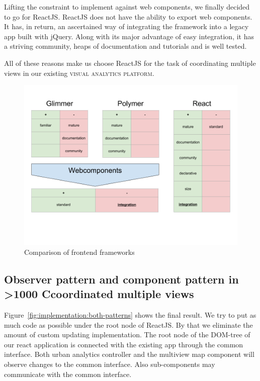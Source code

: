 \documentclass{article}
\newcommand{\visan}{\textsc{visual analytics platform}}
\newcommand\hmm[1]{\ifnum\ifhmode\spacefactor\else2000\fi>1000 \uppercase{#1}\else#1\fi}
\newcommand{\cmvs}{\hmm{c}oordinated multiple views}
\begin{document}
Lifting the constraint to implement against web components, we finally decided to go for ReactJS\cite{React2017}.
ReactJS does not have the ability to export web components.
It has, in return, an ascertained way of integrating the framework into a legacy app built with jQuery.
Along with its major advantage of easy integration, it has a striving community, heaps of documentation and tutorials and is well tested.

All of these reasons make us choose ReactJS for the task of coordinating multiple views in our existing \visan{}.




\begin{figure}[h!]
  \centering
  \includegraphics[width=\textwidth]{images/frontend-frameworks.png}
  \caption{Comparison of frontend frameworks}
  \label{fig:implementation:frontend-frameworks}
\end{figure}

\subsection{Observer pattern and component pattern in \cmvs{}}
Figure~\ref{fig:implementation:both-patterns} shows the final result.
We try to put as much code as possible under the root node of ReactJS.
By that we eliminate the amount of custom updating implementation.
The root node of the DOM-tree of our react application is connected with the existing app through the common interface.
Both urban analytics controller and the multiview map component will observe changes to the common interface.
Also sub-components may communicate with the common interface.
\end{document}
